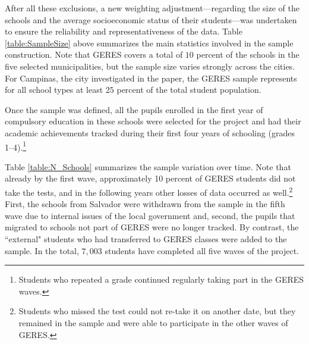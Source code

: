 \documentclass[a4paper, 12pt]{article}
\begin{document}
 

After all these exclusions, a new weighting adjustment—regarding the size of the schools and the average socioeconomic status of their students—was undertaken to ensure the reliability and representativeness of the data. Table \ref{table:SampleSize} above summarizes the main statistics involved in the sample construction. Note that GERES covers a total of $10$ percent of the schools in the five selected municipalities, but the sample size varies strongly across the cities. For Campinas, the city investigated in the paper, the GERES sample represents for all school types at least $25$ percent of the total student population.


Once the sample was defined, all the pupils enrolled in the first year of compulsory education in these schools were selected for the project and had their academic achievements tracked during their first four years of schooling (grades 1–4).\footnote{Students who repeated a grade continued regularly taking part in the GERES waves.}


Table \ref{table:N_Schools} summarizes the sample variation over time. Note that already by the first wave, approximately 10 percent of GERES students did not take the tests, and in the following years other losses of data occurred as well.\footnote{Students who missed the test could not re-take it on another date, but they remained in the sample and were able to participate in the other waves of GERES.} First, the schools from Salvador were withdrawn from the sample in the fifth wave due to internal issues of the local government and, second, the pupils that migrated to schools not part of GERES were no longer tracked. By contrast, the ``external" students who had transferred to GERES classes were added to the sample. In the total, $7,003$ students have completed all five waves of the project.
\end{document}
